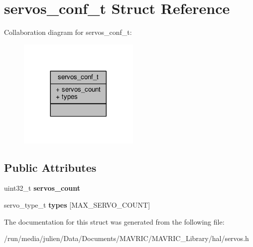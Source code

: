 \hypertarget{structservos__conf__t}{\section{servos\+\_\+conf\+\_\+t Struct Reference}
\label{structservos__conf__t}
}


Collaboration diagram for servos\+\_\+conf\+\_\+t\+:
\nopagebreak
\begin{figure}[H]
\begin{center}
\leavevmode
\includegraphics[width=164pt]{structservos__conf__t__coll__graph}
\end{center}
\end{figure}
\subsection*{Public Attributes}
\begin{DoxyCompactItemize}
\item 
\hypertarget{structservos__conf__t_a5eef262403da23f6faa213379a9d4e64}{uint32\+\_\+t {\bfseries servos\+\_\+count}}\label{structservos__conf__t_a5eef262403da23f6faa213379a9d4e64}

\item 
\hypertarget{structservos__conf__t_a7e9cde61323cf202b194360cfc780fe6}{servo\+\_\+type\+\_\+t {\bfseries types} \mbox{[}M\+A\+X\+\_\+\+S\+E\+R\+V\+O\+\_\+\+C\+O\+U\+N\+T\mbox{]}}\label{structservos__conf__t_a7e9cde61323cf202b194360cfc780fe6}

\end{DoxyCompactItemize}


The documentation for this struct was generated from the following file\+:\begin{DoxyCompactItemize}
\item 
/run/media/julien/\+Data/\+Documents/\+M\+A\+V\+R\+I\+C/\+M\+A\+V\+R\+I\+C\+\_\+\+Library/hal/servos.\+h\end{DoxyCompactItemize}
